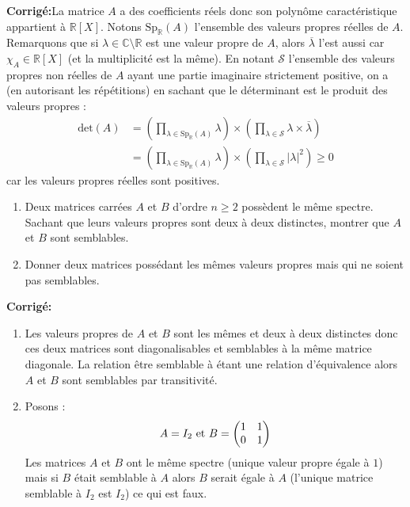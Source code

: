 \documentclass[a4paper,twoside,french,10pt]{VcCours}
\newcommand{\corr}{\textbf{Corrigé:}}
\begin{document}
\corr La matrice $A$ a des coefficients réels donc son polynôme caractéristique appartient à $\mathbb{R}[X]$. Notons $\textrm{Sp}_{\mathbb{R}}(A)$ l'ensemble des valeurs propres réelles de $A$. Remarquons que si $\lambda \in \mathbb{C} \setminus \mathbb{R}$ est une valeur propre de $A$, alors $\overline{\lambda}$ l'est aussi car $\chi_A \in \mathbb{R}[X]$ (et la multiplicité est la même). En notant $\mathcal{S}$ l'ensemble des valeurs propres non réelles de $A$ ayant une partie imaginaire strictement positive, on a (en autorisant les répétitions) en sachant que le déterminant est le produit des valeurs propres :
\begin{align*}
 \textrm{det}(A) & = \left(\prod_{ \lambda \in \textrm{Sp}_{\mathbb{R}}(A)} \lambda \right) \times \left(\prod_{ \lambda \in \mathcal{S}} \lambda  \times \overline{\lambda }\right)  \\
&  = \left(\prod_{ \lambda \in \textrm{Sp}_{\mathbb{R}}(A)} \lambda \right) \times \left(\prod_{ \lambda \in \mathcal{S}} \vert \lambda \vert ^2\right) \geq 0 
 \end{align*}
  car les valeurs propres réelles sont positives.


\begin{Exercice}{}
\begin{enumerate}
\item Deux matrices carrées $A$ et $B$ d'ordre $n \geq 2$ possèdent le même spectre. Sachant que leurs valeurs propres sont deux à deux distinctes, montrer que $A$ et $B$ sont semblables.
\item Donner deux matrices possédant les mêmes valeurs propres mais qui ne soient pas semblables.
\end{enumerate}
\end{Exercice} 

\corr \begin{enumerate}
\item Les valeurs propres de $A$ et $B$ sont les mêmes et deux à deux distinctes donc ces deux matrices sont diagonalisables et semblables à la même matrice diagonale. La relation \og être semblable à \fg étant une relation d'équivalence alors $A$ et $B$ sont semblables par transitivité.
\item Posons :
$$ A = I_2 \hbox{ et } B = \begin{pmatrix}
1 & 1 \\
0 & 1 
\end{pmatrix}$$
Les matrices $A$ et $B$ ont le même spectre (unique valeur propre égale à $1$) mais si $B$ était semblable à $A$ alors $B$ serait égale à $A$ (l'unique matrice semblable à $I_2$ est $I_2$) ce qui est faux.
\end{enumerate}
\end{document}
